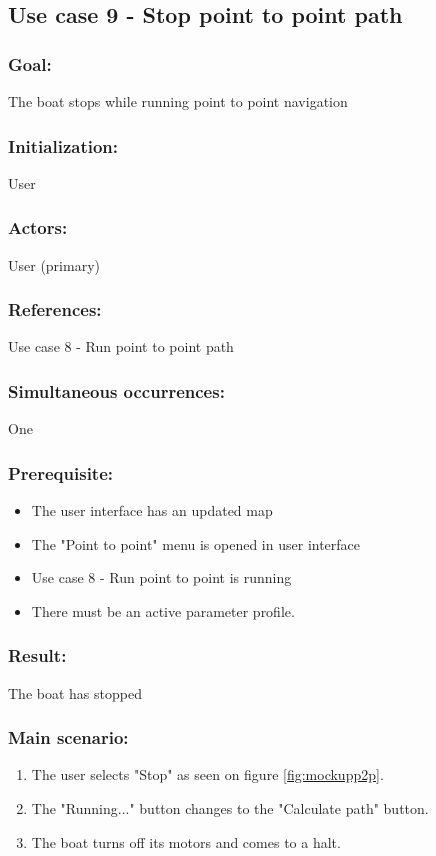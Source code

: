 \begin{framed}
	\subsection{Use case 9 - Stop point to point path}
	\subsubsection*{Goal:}
	The boat stops while running point to point navigation
	
	\subsubsection*{Initialization:}
	User
	
	\subsubsection*{Actors:}
	User (primary)
	
	\subsubsection*{References:}
	Use case 8 - Run point to point path
	
	\subsubsection*{Simultaneous occurrences:}
	One 
	
	\subsubsection*{Prerequisite:}
	\begin{itemize}
		\item The user interface has an updated map
		\item The "Point to point" menu is opened in user interface
		\item Use case 8 - Run point to point is running
		\item There must be an active parameter profile.
		
	\end{itemize}
	
	\subsubsection*{Result:}
	The boat has stopped
	
	\subsubsection*{Main scenario:}
	\begin{enumerate}
		\item The user selects "Stop" as seen on figure \ref{fig:mockupp2p}.
		\item The "Running..." button changes to the "Calculate path" button.
		\item The boat turns off its motors and comes to a halt.
	\end{enumerate}	
\end{framed}	

